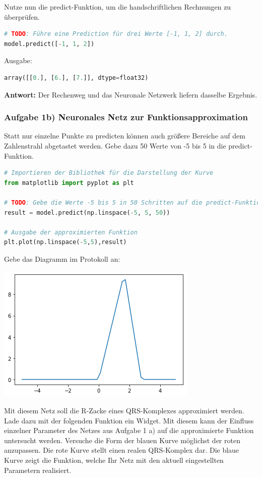 \documentclass[a4paper,10pt,titlepage]{scrartcl}
\begin{document}
Nutze nun die predict-Funktion, um die handschriftlichen Rechnungen zu überprüfen.

\begin{lstlisting}[language=python]
# TODO: Führe eine Prediction für drei Werte [-1, 1, 2] durch.
model.predict([-1, 1, 2])
\end{lstlisting}

Ausgabe:
\begin{lstlisting}[language=python]
array([[0.], [6.], [7.]], dtype=float32)
\end{lstlisting}

\textbf{Antwort:} Der Rechenweg und das Neuronale Netzwerk liefern dasselbe Ergebnis.

\subsubsection{Aufgabe 1b) Neuronales Netz zur Funktionsapproximation}
Statt nur einzelne Punkte zu predicten können auch größere Bereiche auf dem Zahlenstrahl abgetastet werden. Gebe dazu 50 Werte von -5 bis 5 in die predict-Funktion.

\begin{lstlisting}[language=python]
# Importieren der Bibliothek für die Darstellung der Kurve
from matplotlib import pyplot as plt

# TODO: Gebe die Werte -5 bis 5 in 50 Schritten auf die predict-Funktion und speicher die Ausgabe in der Variable result
result = model.predict(np.linspace(-5, 5, 50))

# Ausgabe der approximierten Funktion
plt.plot(np.linspace(-5,5),result)
\end{lstlisting}

Gebe das Diagramm im Protokoll an:
\begin{center}
    \includegraphics[width=.5\linewidth]{Assets/prakBMT-DeepLearning-01.png}
\end{center}

Mit diesem Netz soll die R-Zacke eines QRS-Komplexes approximiert werden. Lade dazu mit der folgenden Funktion ein Widget. Mit diesem kann der Einfluss einzelner Parameter des Netzes aus Aufgabe 1 a) auf die approximierte Funktion untersucht werden. Versuche die Form der blauen Kurve möglichst der roten anzupassen. Die rote Kurve stellt einen realen QRS-Komplex dar. Die blaue Kurve zeigt die Funktion, welche Ihr Netz mit den aktuell eingestellten Parametern realisiert.
\end{document}
